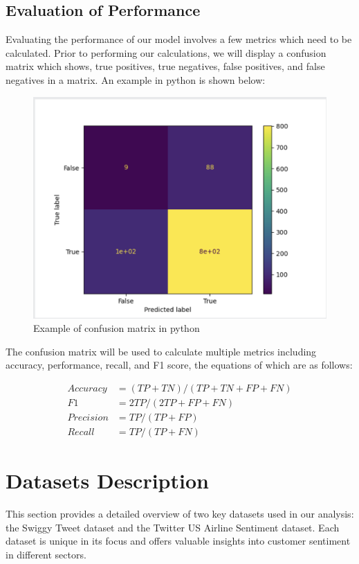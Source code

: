 \documentclass[conference]{IEEEtran}
\begin{document}
\subsection{Evaluation of Performance}
Evaluating the performance of our model involves a few metrics which need to be calculated. 
Prior to performing our calculations, we will display a confusion matrix which shows, true positives, true negatives, false positives, and false negatives in a matrix. 
An example in python is shown below:


\begin{figure}[b]
    \includegraphics[width=0.5 \textwidth]{confusion_matrix.png}
    \caption{Example of confusion matrix in python}    
\end{figure}
The confusion matrix will be used to calculate multiple metrics including accuracy, performance, recall, and F1 score, the equations of which are as follows:

\begin{align}
    Accuracy &= (TP + TN) / (TP + TN + FP + FN)\\
    F1 &= 2TP / (2TP + FP + FN)\\
    Precision &= TP / (TP + FP)\\
    Recall &= TP / (TP + FN)
\end{align}

\section{Datasets Description}
This section provides a detailed overview of two key datasets used in our analysis: the Swiggy Tweet dataset and the Twitter US Airline Sentiment dataset. 
Each dataset is unique in its focus and offers valuable insights into customer sentiment in different sectors.
\end{document}

